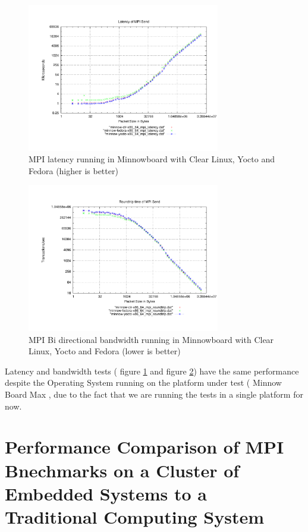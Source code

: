 \begin{figure}[H]
\centering
\includegraphics[width=0.75\textwidth]{images/mpbench_yocto_experiments/mpi_latency.pdf}
\caption{MPI latency running in Minnowboard with Clear Linux,
Yocto and Fedora (higher is better)}
\label{mpi_latency_yocto}
\end{figure}


\begin{figure}[H]
\centering
\includegraphics[width=0.75\textwidth]{images/mpbench_yocto_experiments/mpi_roundtrip.pdf}
\caption{MPI Bi directional bandwidth running in Minnowboard with Clear Linux,
Yocto and Fedora (lower is better)}
\label{mpi_roundtrip_yocto}
\end{figure}

Latency and bandwidth tests ( figure \ref{mpi_latency_yocto} and figure
\ref{mpi_roundtrip_yocto}) have the same performance despite the Operating
System running on the platform under test ( Minnow Board Max , due to the fact
that we are running the tests in a single platform for now.


\section{Performance Comparison of MPI Bnechmarks on a Cluster of Embedded
Systems to a Traditional Computing System}

